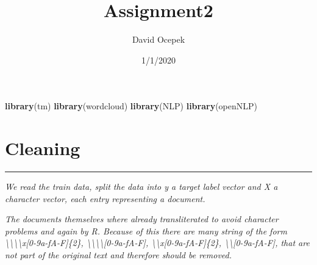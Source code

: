 \documentclass[]{article}
\title{Assignment2}
\author{David Ocepek}
\date{1/1/2020}
\newenvironment{Shaded}{\begin{snugshade}}{\end{snugshade}}
\newcommand{\KeywordTok}[1]{\textcolor[rgb]{0.13,0.29,0.53}{\textbf{#1}}}
\newcommand{\NormalTok}[1]{#1}
\begin{document}
\maketitle

\begin{Shaded}
\begin{Highlighting}[]
\KeywordTok{library}\NormalTok{(tm)}
\KeywordTok{library}\NormalTok{(wordcloud)}
\KeywordTok{library}\NormalTok{(NLP)}
\KeywordTok{library}\NormalTok{(openNLP)}
\end{Highlighting}
\end{Shaded}

\hypertarget{cleaning}{%
\section{Cleaning}\label{cleaning}}

\begin{center}\rule{0.5\linewidth}{\linethickness}\end{center}

\emph{We read the train data, split the data into y a target label
vector and X a character vector, each entry representing a document.}

\emph{The documents themselves where already transliterated to avoid
character problems and again by R. Because of this there are many string
of the form
\textbackslash\textbackslash\textbackslash\textbackslash x{[}0-9a-fA-F{]}\{2\},
\textbackslash\textbackslash\textbackslash\textbackslash{[}0-9a-fA-F{]},
\textbackslash\textbackslash x{[}0-9a-fA-F{]}\{2\},
\textbackslash\textbackslash{[}0-9a-fA-F{]}, that are not part of the
original text and therefore should be removed.}
\end{document}
